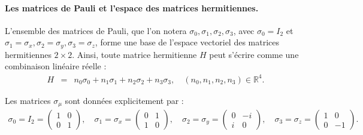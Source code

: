 

\paragraph{Les matrices de Pauli et l'espace des matrices hermitiennes.}

L'ensemble des matrices de Pauli, que l'on notera 
\(\sigma_0, \sigma_1, \sigma_2, \sigma_3\), avec 
\(\sigma_0 = I_2\) et \(\sigma_1 = \sigma_x, \sigma_2 = \sigma_y, \sigma_3 = \sigma_z\), 
forme une base de l'espace vectoriel des matrices hermitiennes $2 \times 2$. 
Ainsi, toute matrice hermitienne \(H\) peut s'écrire comme une combinaison linéaire réelle :
\begin{eqnarray}
H &=& n_0 \sigma_0 + n_1 \sigma_1 + n_2 \sigma_2 + n_3 \sigma_3, \quad (n_0 , n_1 , n_2 , n_3 ) \in \mathbb{R}^4.
\end{eqnarray}

Les matrices \(\sigma_\mu\) sont données explicitement par :
\begin{eqnarray}
\sigma_0 = I_2 = \begin{pmatrix} 1 & 0 \\ 0 & 1 \end{pmatrix}, \quad 
\sigma_1 = \sigma_x = \begin{pmatrix} 0 & 1 \\ 1 & 0 \end{pmatrix}, \quad 
\sigma_2 = \sigma_y = \begin{pmatrix} 0 & -i \\ i & 0 \end{pmatrix}, \quad 
\sigma_3 = \sigma_z = \begin{pmatrix} 1 & 0 \\ 0 & -1 \end{pmatrix}.
\end{eqnarray}

